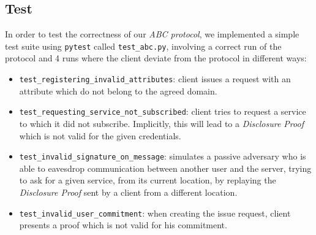 \documentclass[10pt,conference,compsocconf]{IEEEtran}
\begin{document}
\subsection{Test}
In order to test the correctness of our \textit{ABC protocol}, we implemented a
simple test suite using \texttt{pytest} called \texttt{test\_abc.py}, involving
a correct run of the protocol and 4 runs where the client deviate from the
protocol in different ways:
\begin{itemize}
    \item \texttt{test\_registering\_invalid\_attributes}: client issues a
    request with an attribute which do not belong to the agreed domain.
    \item \texttt{test\_requesting\_service\_not\_subscribed}: client tries to
    request a service to which it did not subscribe. Implicitly, this will lead
    to a \textit{Disclosure Proof} which is not valid for the given credentials.
    \item \texttt{test\_invalid\_signature\_on\_message}: simulates a passive
    adversary who is able to eavesdrop communication between another user and
    the server, trying to ask for a given service, from its current location, by
    replaying the \textit{Disclosure Proof} sent by a client from a different
    location.
    \item \texttt{test\_invalid\_user\_commitment}: when creating the issue
    request, client presents a proof which is not valid for his commitment.
\end{itemize}
\end{document}
